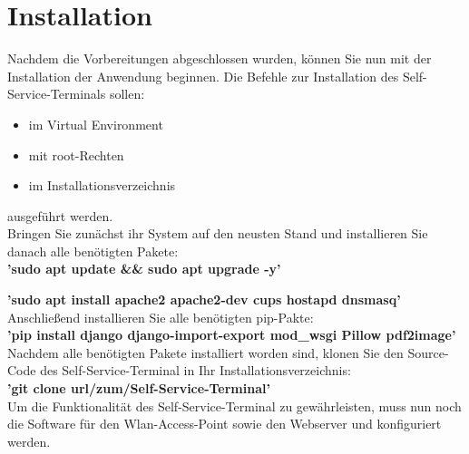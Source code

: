 \section{Installation}
Nachdem die Vorbereitungen abgeschlossen wurden, können Sie nun mit der Installation der Anwendung beginnen. Die Befehle zur Installation des Self-Service-Terminals sollen:

\begin{itemize}
    \item im Virtual Environment
    \item mit root-Rechten
    \item im Installationsverzeichnis
\end{itemize}

\noindent ausgeführt werden.\\

\noindent Bringen Sie zunächst ihr System auf den neusten Stand und installieren Sie danach alle benötigten Pakete:\\

\textbf{’sudo apt update \&\& sudo apt upgrade -y’}\par
\textbf{’sudo apt install apache2 apache2-dev cups hostapd dnsmasq’}\\

\noindent Anschließend installieren Sie alle benötigten pip-Pakte:\\

\textbf{’pip install django django-import-export mod\_wsgi Pillow pdf2image’}\\

\noindent Nachdem alle benötigten Pakete installiert worden sind, klonen Sie den Source-Code des Self-Service-Terminal in Ihr Installationsverzeichnis:\\

\textbf{’git clone url/zum/Self-Service-Terminal’}\\

\noindent Um die Funktionalität des Self-Service-Terminal zu gewährleisten, muss nun noch die Software für den Wlan-Access-Point sowie den Webserver und konfiguriert werden.